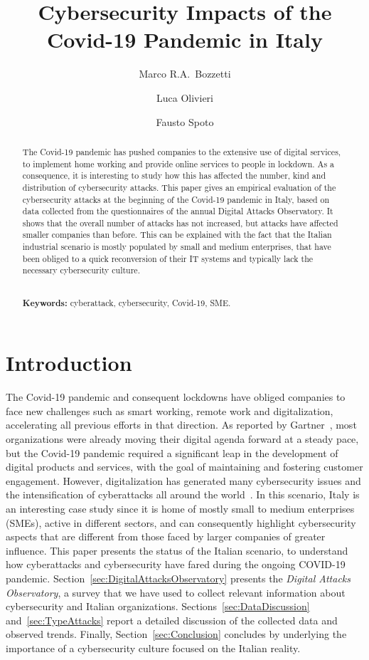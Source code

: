 \documentclass{easychair}
\title{Cybersecurity Impacts of the Covid-19 Pandemic in Italy}
\author{
  Marco R.A.\ Bozzetti\inst{1,2,3}
  \and
  Luca Olivieri\inst{4}
  \and
  Fausto Spoto\inst{4}
}
\institute{
  Associazione Italiana Professionisti della Sicurezza Informatica (AIPSI), Milano, Italy
\and
  Information Systems Security Association (ISSA)
\and
Digital Attacks Observatory (OAD) Team, Italy\\
\email{m.bozzetti@aipsi.org}
\and
   University of Verona, Verona, Italy\\
   \email{\{luca.olivieri,fausto.spoto\}@univr.it}\\
 }
\begin{document}
\maketitle

\begin{abstract}
  The Covid-19 pandemic has pushed companies to the extensive
  use of digital services, to implement home working and provide
  online services to people in lockdown. As a consequence, it is interesting
  to study how this has affected the number, kind and distribution of cybersecurity
  attacks. This paper gives an empirical evaluation of the cybersecurity attacks
  at the beginning of the Covid-19 pandemic in Italy, based on data collected from
  the questionnaires of the annual Digital Attacks Observatory. It shows that the overall
  number of attacks has not increased, but attacks have affected smaller companies
  than before. This can be explained with the fact that the Italian
  industrial scenario is mostly populated by small and medium enterprises,
  that have been obliged to a quick reconversion of their IT systems and typically
  lack the necessary cybersecurity culture.

  \mbox{}\\
  \textbf{Keywords:} cyberattack, cybersecurity, Covid-19, SME.
\end{abstract}

\section{Introduction}

The Covid-19 pandemic and consequent lockdowns have obliged
companies to face new challenges such as smart working, remote work and digitalization,
accelerating all previous efforts in that direction.
As reported by Gartner~\cite{Goasduff20}, most organizations were already moving
their digital agenda forward at a steady pace, but the Covid-19 pandemic required
a significant leap in the 
development of digital products and services, with the goal of
maintaining and fostering customer engagement.
However, digitalization has generated many cybersecurity 
issues and the intensification of cyberattacks all around the world~\cite{HKICS20,PA21}.
In this scenario, Italy is an interesting case study since it is home
of mostly small to medium enterprises (SMEs), active in different sectors,
and can consequently highlight cybersecurity aspects that are different from those
faced by larger companies of greater influence. This paper presents the status of the
Italian scenario, to understand how cyberattacks and cybersecurity have fared
during the ongoing COVID-19 pandemic.
Section~\ref{sec:DigitalAttacksObservatory} presents the \textit{Digital Attacks Observatory},
a survey that we have used to collect relevant information about cybersecurity and 
Italian organizations.
Sections~\ref{sec:DataDiscussion} and~\ref{sec:TypeAttacks} report
a detailed discussion of the collected data and observed trends.
Finally, Section~\ref{sec:Conclusion} concludes by underlying the importance of
a cybersecurity culture focused on the Italian reality.
\end{document}
